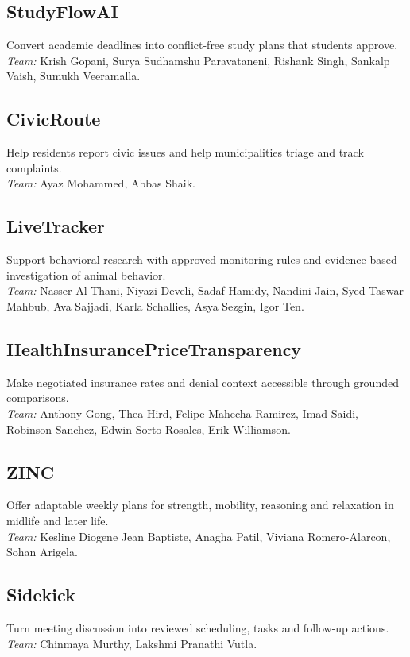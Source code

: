 \documentclass[sigconf,nonacm]{acmart}
\begin{document}
\subsection*{StudyFlowAI}
Convert academic deadlines into conflict-free study plans that students approve.\\
\textit{Team:} Krish Gopani, Surya Sudhamshu Paravataneni, Rishank Singh, Sankalp Vaish, Sumukh Veeramalla.

\subsection*{CivicRoute}
Help residents report civic issues and help municipalities triage and track complaints.\\
\textit{Team:} Ayaz Mohammed, Abbas Shaik.

\subsection*{LiveTracker}
Support behavioral research with approved monitoring rules and evidence-based investigation of animal behavior.\\
\textit{Team:} Nasser Al Thani, Niyazi Develi, Sadaf Hamidy, Nandini Jain, Syed Taswar Mahbub, Ava Sajjadi, Karla Schallies, Asya Sezgin, Igor Ten.

\subsection*{HealthInsurancePriceTransparency}
Make negotiated insurance rates and denial context accessible through grounded comparisons.\\
\textit{Team:} Anthony Gong, Thea Hird, Felipe Mahecha Ramirez, Imad Saidi, Robinson Sanchez, Edwin Sorto Rosales, Erik Williamson.

\subsection*{ZINC}
Offer adaptable weekly plans for strength, mobility, reasoning and relaxation in midlife and later life.\\
\textit{Team:} Kesline Diogene Jean Baptiste, Anagha Patil, Viviana Romero-Alarcon, Sohan Arigela.

\subsection*{Sidekick}
Turn meeting discussion into reviewed scheduling, tasks and follow-up actions.\\
\textit{Team:} Chinmaya Murthy, Lakshmi Pranathi Vutla.
\end{document}
